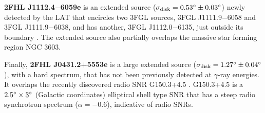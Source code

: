 {\bfseries 2FHL J1112.4$-$6059e} is an extended source (${\rm \sigma_{disk} =  0.53^{\circ} \pm 0.03^{\circ}}$) newly detected by the LAT that encircles two 3FGL sources, 3FGL J1111.9$-$6058 and 3FGL J1111.9$-$6038, and has another, 3FGL J1112.0$-$6135, just outside its boundary \citep{3FGL}. The extended source also partially overlaps the massive star forming region NGC 3603. %

Finally, {\bfseries 2FHL J0431.2+5553e} is a large extended source (${\rm \sigma_{disk} =  1.27^{\circ} \pm 0.04^{\circ}}$), with { a hard spectrum}, that has not been previously detected at $\gamma$-ray energies. It overlaps the recently discovered radio SNR G150.3+4.5 \citep{Gao14}. G150.3+4.5 is a ${\rm 2.5^{\circ}}\times {\rm 3^{\circ}}$ (Galactic coordinates)
elliptical shell type SNR that has a steep radio synchrotron spectrum ($\alpha = -0.6$), indicative of radio SNRs.%

